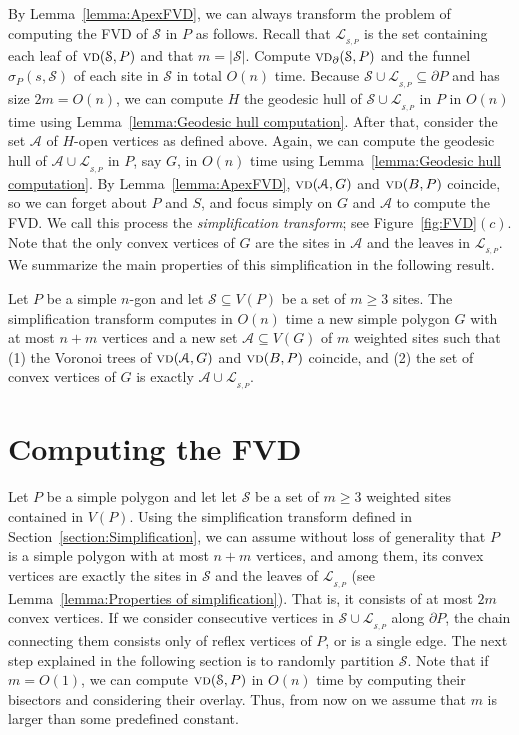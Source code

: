 \documentclass[a4paper,UKenglish]{socg-lipics-v2018}
\newcommand{\s}{\mathcal S}
\newcommand{\funnel}[2][P]{\ensuremath{\sigma_{\scriptscriptstyle #1}(#2)}}
\newcommand{\vd}[2][P]{\textsc{vd}(#2, #1)}
\newcommand{\bvd}[2][P]{\textsc{vd}_{\partial}(#2, #1)}
\newcommand{\LL}[1][\s, P]{\ensuremath{\mathcal L_{_{#1}}}}
\newcommand{\A}{\ensuremath{\mathcal A}}
\begin{document}
By Lemma~\ref{lemma:ApexFVD}, we can always transform the problem of computing the FVD of $\s$ in $P$ as follows. 
Recall that $\LL$ is the set containing each leaf of $\vd{\s}$ and that $m= |\s|$.
Compute $\bvd{\s}$ and the funnel $\funnel{s, \s}$ of each site in $\s$ in total $O(n)$ time. 
Because $\s\cup \LL\subseteq \partial P$ and has size $2 m = O(n)$, we can compute $H$ the geodesic hull of $\s\cup \LL$ in $P$ in $O(n)$ time using Lemma~\ref{lemma:Geodesic hull computation}. 
After that, consider the set $\A$ of $H$-open vertices as defined above.
Again, we can compute the geodesic hull of $\A\cup \LL$ in $P$, say $G$, in $O(n)$ time using Lemma~\ref{lemma:Geodesic hull computation}. 
By Lemma~\ref{lemma:ApexFVD}, $\vd[G]{\A}$ and $\vd[P]{B}$ coincide, so we can forget about $P$ and $S$, and focus simply on $G$ and $\A$ to compute the FVD.
We call this process the \emph{simplification transform}; see Figure~\ref{fig:FVD}$(c)$. 
Note that the only convex vertices of $G$ are the sites in $\A$ and the leaves in $\LL$. 
We summarize the main properties of this simplification in the following result.

\begin{lemma}\label{lemma:Properties of simplification}
Let  $P$ be a simple $n$-gon and let $\s\subseteq V(P)$ be a set of $m\geq 3$ sites.
The simplification transform computes in $O(n)$ time a new simple polygon $G$ with at most $n+m$ vertices and a new set $\A\subseteq V(G)$ of $m$ weighted sites such that (1) the Voronoi trees of $\vd[G]{\A}$ and $\vd[P]{B}$ coincide, and (2) the set of convex vertices of $G$ is exactly $\A\cup \LL$.
\end{lemma}



\section{Computing the FVD}
Let  $P$ be a simple polygon and let let $\s$ be a set of $m\geq 3$ weighted sites contained in $V(P)$.
Using the simplification transform defined in Section~\ref{section:Simplification}, we can assume without loss of generality that $P$ is a simple polygon with at most $n+m$ vertices, and among them, its convex vertices are exactly the sites in $\s$ and the leaves of $\LL$ (see Lemma~\ref{lemma:Properties of simplification}). 
That is, it consists of at most $2m$ convex vertices.
If we consider consecutive vertices in $\s\cup \LL$ along $\partial P$, the chain connecting them consists only of reflex vertices of $P$, or is a single edge. 
The next step explained in the following section is to randomly partition $\s$.
Note that if $m = O(1)$, we can compute $\vd{\s}$ in $O(n)$ time by computing their bisectors and considering their overlay. Thus, from now on we assume that $m$ is larger than some predefined constant.
\end{document}
